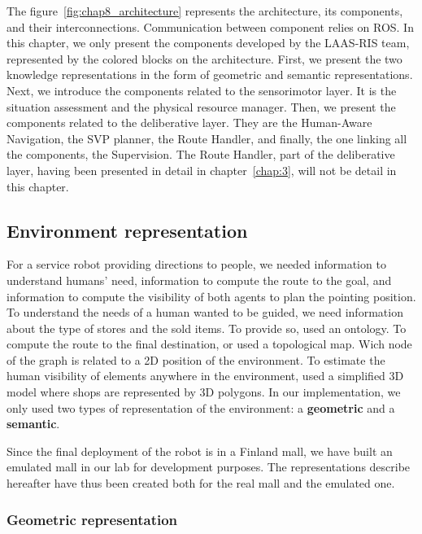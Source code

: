 The figure~\ref{fig:chap8_architecture} represents the architecture, its components, and their interconnections. Communication between component relies on ROS. In this chapter, we only present the components developed by the LAAS-RIS team, represented by the colored blocks on the architecture. First, we present the two knowledge representations in the form of geometric and semantic representations. Next, we introduce the components related to the sensorimotor layer. It is the situation assessment and the physical resource manager. Then, we present the components related to the deliberative layer. They are the Human-Aware Navigation, the SVP planner, the Route Handler, and finally, the one linking all the components, the Supervision. The Route Handler, part of the deliberative layer, having been presented in detail in chapter~\ref{chap:3}, will not be detail in this chapter.

\subsection{Environment representation}

For a service robot providing directions to people, we needed information to understand humans' need, information to compute the route to the goal, and information to compute the visibility of both agents to plan the pointing position. To understand the needs of a human wanted to be guided, we need information about the type of stores and the sold items. To provide so, \cite{satake_2015_field, satake_2015_should} used an ontology. To compute the route to the final destination, \cite{matsumoto_2012_you} or \cite{okuno_2009_providing} used a topological map. Wich node of the graph is related to a 2D position of the environment. To estimate the human visibility of elements anywhere in the environment, \cite{matsumoto_2012_you} used a simplified 3D model where shops are represented by 3D polygons. In our implementation, we only used two types of representation of the environment: a \textbf{geometric} and a \textbf{semantic}.

Since the final deployment of the robot is in a Finland mall, we have built an emulated mall in our lab for development purposes. The representations describe hereafter have thus been created both for the real mall and the emulated one.

\subsubsection{Geometric representation}

